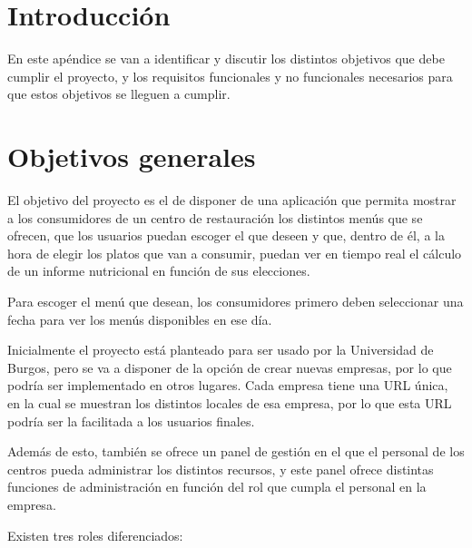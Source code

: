 
\section{Introducción}

En este apéndice se van a identificar y discutir los distintos objetivos que debe cumplir el proyecto, y los requisitos funcionales y no funcionales necesarios para que estos objetivos se lleguen a cumplir.


\section{Objetivos generales}

El objetivo del proyecto es el de disponer de una aplicación que permita mostrar a los consumidores de un centro de restauración los distintos menús que se ofrecen, que los usuarios puedan escoger el que deseen y que, dentro de él, a la hora de elegir los platos que van a consumir, puedan ver en tiempo real el cálculo de un informe nutricional en función de sus elecciones. 

Para escoger el menú que desean, los consumidores primero deben seleccionar una fecha para ver los menús disponibles en ese día.

Inicialmente el proyecto está planteado para ser usado por la Universidad de Burgos, pero se va a disponer de la opción de crear nuevas empresas, por lo que podría ser implementado en otros lugares. Cada empresa tiene una URL única, en la cual se muestran los distintos locales de esa empresa, por lo que esta URL podría ser la facilitada a los usuarios finales.

Además de esto, también se ofrece un panel de gestión en el que el personal de los centros pueda administrar los distintos recursos, y este panel ofrece distintas funciones de administración en función del rol que cumpla el personal en la empresa.

Existen tres roles diferenciados:

